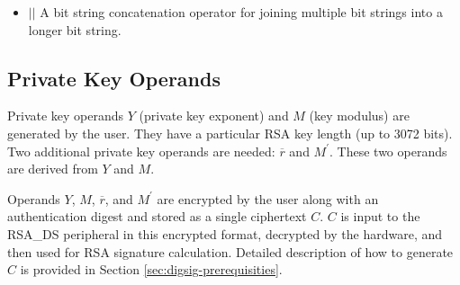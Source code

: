 \documentclass[main\_\_EN.tex]{subfiles}
\begin{document}
\begin{itemize}
    \item 
        \begin{math}{ || }\end{math}  \hspace{1.0cm}      A bit string concatenation operator for joining multiple bit strings into a longer bit string.
\end{itemize}

\subsection{Private Key Operands}
\label{sec:digsig-private-key-operands}

Private key operands \begin{math}Y\end{math} (private key exponent) and \begin{math}M\end{math} (key modulus) are generated by the user. They have a particular RSA key length (up to 3072 bits).
Two additional private key operands are needed: \begin{math}\overline{r}\end{math} and \begin{math}M^{\prime}\end{math}. These two operands are derived from \begin{math}Y\end{math} and \begin{math}M\end{math}.

Operands \begin{math}Y\end{math}, \begin{math}M\end{math}, \begin{math}\overline{r}\end{math}, and \begin{math}M^{\prime}\end{math} are encrypted by the user along with an authentication digest and stored as a single ciphertext \begin{math}C\end{math}. \begin{math}C\end{math} is input to the RSA\_DS peripheral in this encrypted format, decrypted by the hardware, and then used for RSA signature calculation. Detailed description of how to generate \begin{math}C\end{math} is provided in Section \ref{sec:digsig-prerequisities}.
\end{document}
